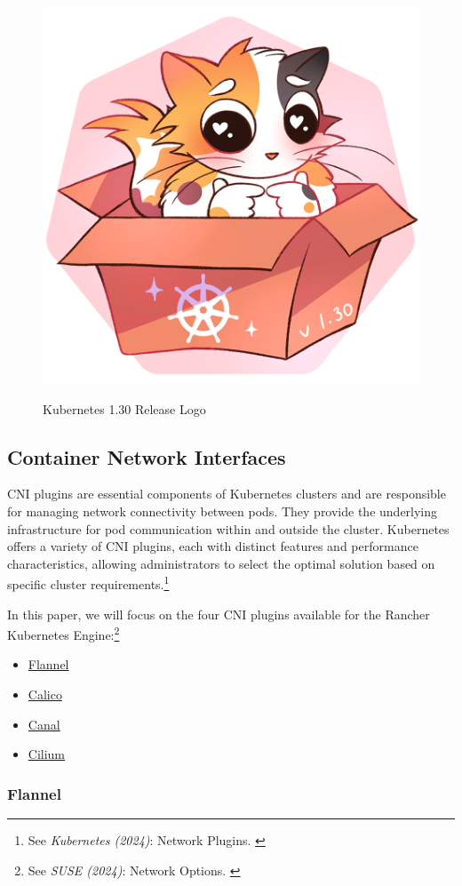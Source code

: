 \begin{figure}[H]
\centering
\caption {Kubernetes 1.30 Release Logo}
\includegraphics[width=0.3\linewidth]{images/k8s-1.30.png}
\label{fig:uwubernetes}
\end{figure}

\subsection{Container Network Interfaces}

CNI plugins are essential components of Kubernetes clusters and are responsible for managing network connectivity between pods. They provide the underlying infrastructure for pod communication within and outside the cluster. Kubernetes offers a variety of CNI plugins, each with distinct features and performance characteristics, allowing administrators to select the optimal solution based on specific cluster requirements.\footnote{See \textit{Kubernetes (2024)}: Network Plugins. \cite{networkPlugin}}

In this paper, we will focus on the four CNI plugins available for the Rancher Kubernetes Engine:\footnote{See \textit{SUSE (2024)}: Network Options. \cite{networkOptions}}

\begin{itemize}
    \item \href{https://github.com/flannel-io/flannel}{Flannel}
    \item \href{https://www.tigera.io/project-calico/}{Calico}
    \item \href{https://docs.tigera.io/calico/latest/getting-started/kubernetes/flannel/install-for-flannel#installing-calico-for-policy-and-flannel-aka-canal-for-networking}{Canal}
    \item \href{https://github.com/cilium/cilium}{Cilium}
\end{itemize}

\subsubsection{Flannel}

